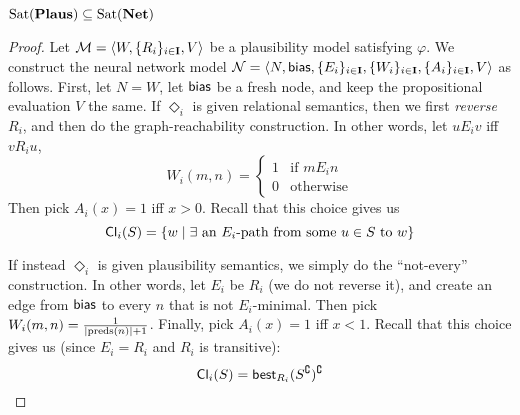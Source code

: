 \documentclass[letterpaper]{article}
\begin{document}

\begin{proposition}
    $\mathrm{Sat}( \textrm{\textbf{Plaus}} ) \subseteq \mathrm{Sat}( \textrm{\textbf{Net}} )$
\end{proposition}
\begin{proof}
    Let $\mathcal{M} = \langle W, \{ R_i \}_{i \in \textbf{I}}, V \rangle$ be a plausibility model satisfying $\varphi$.  We construct the neural network model $\mathcal{N} = \langle N, \mathsf{bias}, \{ E_i \}_{i \in \textbf{I}}, \{ W_i \}_{i \in \textbf{I}}, \{ A_i \}_{i \in \textbf{I}}, V \rangle$ as follows.  First, let $N = W$, let $\mathsf{bias}$ be a fresh node, and keep the propositional evaluation $V$ the same.  If $\Diamond_i$ is given relational semantics, then we first \emph{reverse} $R_i$, and then do the graph-reachability construction.  In other words, let $u{E_i}v$ iff $v{R_i}u$, 
    \[
        W_i(m, n) = 
        \begin{cases}
            1 & \mbox{if } m{E_i}n \\
            0 & \mbox{otherwise}
        \end{cases}
    \]
    Then pick $A_i(x) = 1$ iff $x > 0$.  Recall that this choice gives us
    \[
        \mathsf{Cl}_i(S) = \{ w \mid \exists \mbox{ an } E_i\mbox{-path from some } u \in S \mbox{ to } w \}            
    \]

    If instead $\Diamond_i$ is given plausibility semantics, we simply do the ``not-every'' construction.  In other words, let $E_i$ be $R_i$ (we do not reverse it), and create an edge from $\mathsf{bias}$ to every $n$ that is not $E_i$-minimal.  Then pick $W_i(m, n) = \frac{1}{|\mathrm{preds}(n)|+1}$.  Finally, pick $A_i(x) = 1$ iff $x < 1$.  Recall that this choice gives us (since $E_i = R_i$ and $R_i$ is transitive):
    \[
        \mathsf{Cl}_i(S) = \mathsf{best}_{R_i}(S^\complement)^\complement
    \]
    

\end{proof}
\end{document}

